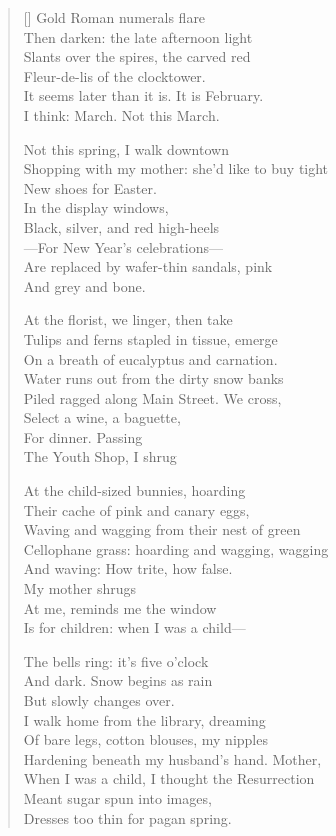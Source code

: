 \label{ch:requiescat}
\settowidth{\versewidth}{Shopping with my mother: she'd like to buy tight}
\begin{verse}[\versewidth]
Gold Roman numerals flare\\
Then darken: the late afternoon light\\
Slants over the spires, the carved red\\
Fleur-de-lis  of the clocktower.\\
It seems later than it is. It is February.\\
I think: March. Not this March.

Not this spring, I walk downtown\\
Shopping with my mother: she'd like to buy tight\\
New shoes for Easter.\\
In the display windows,\\
Black, silver, and red high-heels\\
---For New Year's celebrations---\\
Are replaced by wafer-thin sandals, pink\\
And grey and bone.

At the florist, we linger, then take\\
Tulips and ferns stapled in tissue, emerge\\
On a breath of eucalyptus and carnation.\\
Water runs out from the dirty snow banks\\
Piled ragged along Main Street.     We cross,\\
Select a wine, a baguette,\\
For dinner.    Passing\\
The Youth Shop, I shrug

At the child-sized bunnies, hoarding\\
Their cache of pink and canary eggs,\\
Waving and wagging from their nest of green\\
Cellophane grass: hoarding and wagging, wagging\\
And waving: How trite, how false.\\
My mother shrugs\\
At me, reminds me the window\\
Is for children: when I was a child---

The bells ring: it's five o'clock\\
And dark. Snow begins as rain\\
But slowly changes over.\\
I walk home from the library, dreaming\\
Of bare legs, cotton blouses, my nipples\\
Hardening beneath my husband's hand.   Mother,\\
When I was a child, I thought the Resurrection\\
Meant sugar spun into images,\\

Dresses too thin for pagan spring.
\end{verse}

